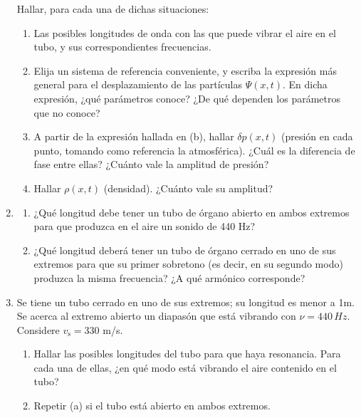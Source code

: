 \documentclass[11pt,spanish]{article}
\begin{document}
\begin{enumerate}
    Hallar, para cada una de dichas situaciones: 

    \begin{enumerate}
        \item Las posibles longitudes de onda con las que puede vibrar el aire
        en el tubo, y sus correspondientes frecuencias.

        \item Elija un sistema de referencia conveniente, y escriba la expresión
        más general para el desplazamiento de las partículas $\Psi(x,t)$. En
        dicha expresión, ¿qué parámetros conoce? ¿De qué dependen los parámetros
        que no conoce?

        \item A partir de la expresión hallada en (b), hallar $\delta p(x,t)$
        (presión en cada punto, tomando como referencia la atmosférica). ¿Cuál
        es la diferencia de fase entre ellas? ¿Cuánto vale la amplitud de
        presión?

        \item Hallar $\rho(x,t)$ (densidad). ¿Cuánto vale su amplitud?
    \end{enumerate}


    \item
    \begin{enumerate}
        \item ¿Qué longitud debe tener un tubo de órgano abierto en ambos
        extremos para que produzca en el aire un sonido de 440 Hz?

        \item ¿Qué longitud deberá tener un tubo de órgano cerrado en uno de sus
        extremos para que su primer sobretono (es decir, en su segundo modo)
        produzca la misma frecuencia? ¿A qué armónico corresponde?
    \end{enumerate}


    \item Se tiene un tubo cerrado en uno de sus extremos; su longitud es menor
    a 1m. Se acerca al extremo abierto un diapasón que está vibrando con
    $\nu=440\unit{\, Hz}$. Considere $v_\text{s}=330$ m/s.

    \begin{enumerate}
        \item Hallar las posibles longitudes del tubo para que haya resonancia.
        Para cada una de ellas, ¿en qué modo está vibrando el aire contenido en
        el tubo? 
        \item Repetir (a) si el tubo está abierto en ambos extremos.
    \end{enumerate}


\end{enumerate}
\end{document}
